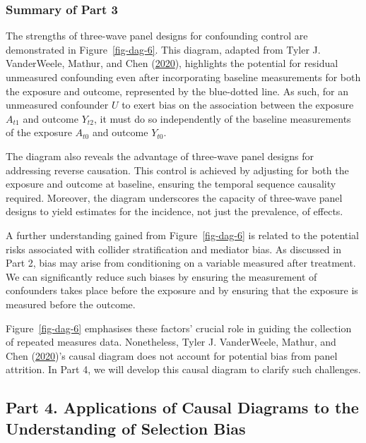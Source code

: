 \documentclass[
  singlecolumn]{article}
\begin{document}
\hypertarget{summary-of-part-3}{%
\subsubsection{Summary of Part 3}\label{summary-of-part-3}}

The strengths of three-wave panel designs for confounding control are
demonstrated in Figure~\ref{fig-dag-6}. This diagram, adapted from Tyler
J. VanderWeele, Mathur, and Chen
(\protect\hyperlink{ref-vanderweele2020}{2020}), highlights the
potential for residual unmeasured confounding even after incorporating
baseline measurements for both the exposure and outcome, represented by
the blue-dotted line. As such, for an unmeasured confounder \(U\) to
exert bias on the association between the exposure \(A_{t1}\) and
outcome \(Y_{t2}\), it must do so independently of the baseline
measurements of the exposure \(A_{t0}\) and outcome \(Y_{t0}\).

The diagram also reveals the advantage of three-wave panel designs for
addressing reverse causation. This control is achieved by adjusting for
both the exposure and outcome at baseline, ensuring the temporal
sequence causality required. Moreover, the diagram underscores the
capacity of three-wave panel designs to yield estimates for the
incidence, not just the prevalence, of effects.

A further understanding gained from Figure~\ref{fig-dag-6} is related to
the potential risks associated with collider stratification and mediator
bias. As discussed in Part 2, bias may arise from conditioning on a
variable measured after treatment. We can significantly reduce such
biases by ensuring the measurement of confounders takes place before the
exposure and by ensuring that the exposure is measured before the
outcome.

Figure~\ref{fig-dag-6} emphasises these factors' crucial role in guiding
the collection of repeated measures data. Nonetheless, Tyler J.
VanderWeele, Mathur, and Chen
(\protect\hyperlink{ref-vanderweele2020}{2020})'s causal diagram does
not account for potential bias from panel attrition. In Part 4, we will
develop this causal diagram to clarify such challenges.

\hypertarget{part-4.-applications-of-causal-diagrams-to-the-understanding-of-selection-bias}{%
\subsection{Part 4. Applications of Causal Diagrams to the Understanding
of Selection
Bias}\label{part-4.-applications-of-causal-diagrams-to-the-understanding-of-selection-bias}}
\end{document}
